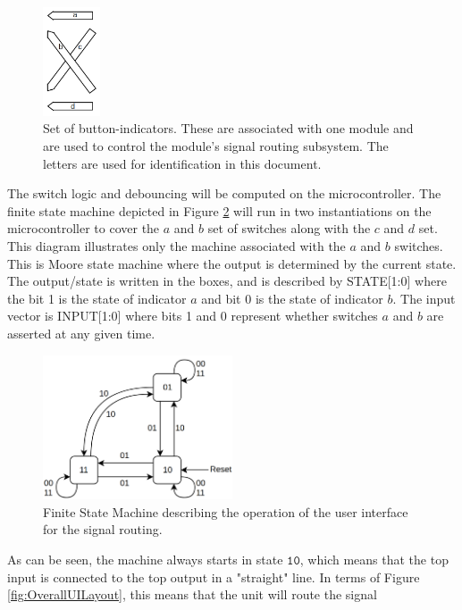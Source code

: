 \documentclass{article}
\begin{document}
	\begin{figure}
		\centering
		\includegraphics[width = 0.15\textwidth]{PR4Images/UIarrowlabels.png}
		\caption{Set of button-indicators.  These are associated with one module and are used to control the module's signal routing subsystem.  The letters are used for identification in this document.}
		\label{fig:UIarrowlabels}
	\end{figure}

	The switch logic and debouncing will be computed on the microcontroller.  The finite state machine depicted in Figure \ref{fig:UIFSM} will run in two instantiations on the microcontroller to cover the $a$ and $b$ set of switches along with the $c$ and $d$ set.  This diagram illustrates only the machine associated with the $a$ and $b$ switches.  This is Moore state machine where the output is determined by the current state.  The output/state is written in the boxes, and is described by STATE[1:0] where the bit 1 is the state of indicator $a$ and bit 0 is the state of indicator $b$.  The input vector is INPUT[1:0] where bits 1 and 0 represent whether switches $a$ and $b$ are asserted at any given time.

	\begin{figure}
		\centering
		\includegraphics[width = 0.5\textwidth]{PR4Images/UIFSM.png}
		\caption{Finite State Machine describing the operation of the user interface for the signal routing.}
		\label{fig:UIFSM}
	\end{figure}

	As can be seen, the machine always starts in state $\mathtt{10}$, which means that the top input is connected to the top output in a "straight" line.  In terms of Figure \ref{fig:OverallUILayout}, this means that the unit will route the signal
\end{document}
